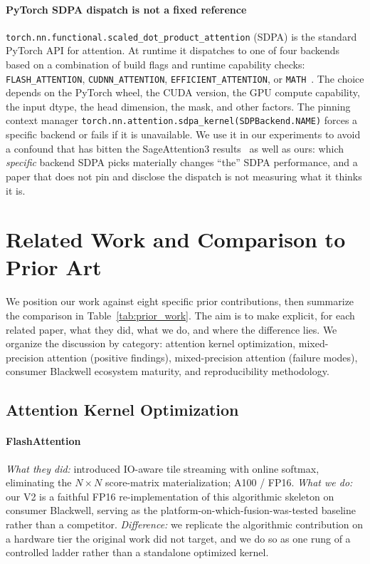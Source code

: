 \documentclass[conference]{IEEEtran}
\begin{document}
\paragraph*{PyTorch SDPA dispatch is not a fixed reference}
\texttt{torch.nn.functional.scaled\_dot\_product\_attention} (SDPA)
is the standard PyTorch API for attention. At runtime it dispatches
to one of four backends based on a combination of build flags and
runtime capability checks: \texttt{FLASH\_ATTENTION},
\texttt{CUDNN\_ATTENTION}, \texttt{EFFICIENT\_ATTENTION}, or
\texttt{MATH}~\cite{pytorch2024sdpa}. The choice depends on the
PyTorch wheel, the CUDA version, the GPU compute capability, the
input dtype, the head dimension, the mask, and other factors. The
pinning context manager
\texttt{torch.nn.attention.sdpa\_kernel(SDPBackend.NAME)} forces a
specific backend or fails if it is unavailable. We use it in our
experiments to avoid a confound that has bitten the SageAttention3
results~\cite{zhang2025sageattention3} as well as ours: which
\emph{specific} backend SDPA picks materially changes ``the'' SDPA
performance, and a paper that does not pin and disclose the dispatch
is not measuring what it thinks it is.

\section{Related Work and Comparison to Prior Art}
\label{sec:related}

We position our work against eight specific prior contributions, then
summarize the comparison in Table~\ref{tab:prior_work}. The aim is to
make explicit, for each related paper, what they did, what we do, and
where the difference lies. We organize the discussion by category:
attention kernel optimization, mixed-precision attention (positive
findings), mixed-precision attention (failure modes), consumer
Blackwell ecosystem maturity, and reproducibility methodology.

\subsection{Attention Kernel Optimization}

\paragraph*{FlashAttention~\cite{dao2022flashattention}}
\emph{What they did:} introduced IO-aware tile streaming with online
softmax, eliminating the $N{\times}N$ score-matrix materialization;
A100 / FP16. \emph{What we do:} our V2 is a faithful FP16
re-implementation of this algorithmic skeleton on consumer Blackwell,
serving as the platform-on-which-fusion-was-tested baseline rather
than a competitor. \emph{Difference:} we replicate the algorithmic
contribution on a hardware tier the original work did not target, and
we do so as one rung of a controlled ladder rather than a standalone
optimized kernel.
\end{document}
